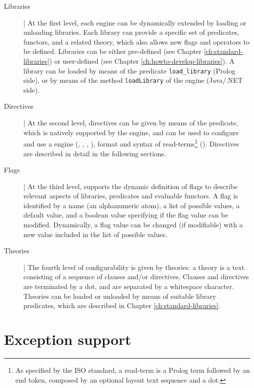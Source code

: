 \begin{description}

\item[Libraries] |
At the first level, each \tuprolog{} engine can be dynamically extended by loading or unloading libraries.
%
Each library can provide a specific set of predicates, functors, and a related theory, which also allows new flags and operators to be defined.
%
Libraries can be either pre-defined (see Chapter \ref{ch:standard-libraries}) or user-defined (see Chapter \ref{ch:howto-develop-libraries}).
%
A library can be loaded by means of the predicate \texttt{load\_library} (Prolog side), or by means of the method \texttt{loadLibrary} of the \tuprolog{} engine (Java/.NET side).


\item[Directives] |
At the second level, directives can be given by means of the  predicate, which is natively supported by the engine, and can be used to configure and use a \tuprolog{} engine (, , , ), format and syntax of read-terms\footnote{As specified by the ISO standard, a read-term is a Prolog term followed by an end token, composed by an optional layout text sequence and a dot.} ().
%
Directives are described in detail in the following sections.

\item[Flags] |
At the third level, \tuprolog{} supports the dynamic definition of flags to describe relevant aspects of libraries, predicates and evaluable functors.
%
A flag is identified by a name (an alphanumeric atom), a list of possible values, a default value, and a boolean value specifying if the flag value can be modified.
%
Dynamically, a flag value can be changed (if modifiable) with a new value included in the list of possible values.

\item[Theories] |
The fourth level of configurability is given by theories: a theory is a text consisting of a sequence of clauses and/or directives.
%
Clauses and directives are terminated by a dot, and are separated by a whitespace character.
%
Theories can be loaded or unloaded by means of suitable library predicates, which are described in Chapter \ref{ch:standard-libraries}.

\end{description}

\section{Exception support}
\label{sec:exception-support}

